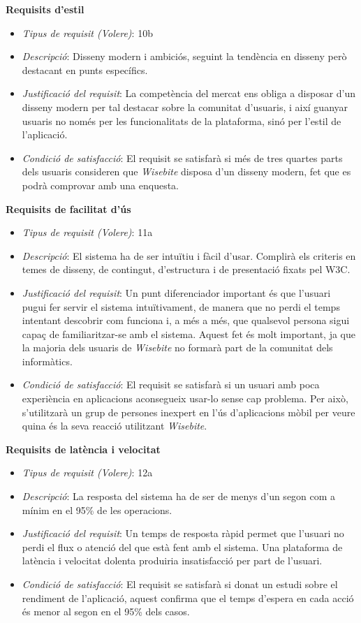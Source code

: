 \noindent\textbf{Requisits d'estil}
\begin{itemize}
\item \textit{Tipus de requisit (Volere)}: 10b
\item \textit{Descripció}: Disseny modern i ambiciós, seguint la tendència en disseny però destacant en punts específics.
\item \textit{Justificació del requisit}: La competència del mercat ens obliga a disposar d'un disseny modern per tal destacar sobre la comunitat d'usuaris, i així guanyar usuaris no només per les funcionalitats de la plataforma, sinó per l'estil de l'aplicació.
\item \textit{Condició de satisfacció}: El requisit se satisfarà si més de tres quartes parts dels usuaris consideren que \textit{Wisebite} disposa d'un disseny modern, fet que es podrà comprovar amb una enquesta.
\end{itemize}

\noindent\textbf{Requisits de facilitat d'ús}
\begin{itemize}
\item \textit{Tipus de requisit (Volere)}: 11a
\item \textit{Descripció}: El sistema ha de ser intuïtiu i fàcil d'usar. Complirà els criteris en temes de disseny, de contingut, d'estructura i de presentació fixats pel W3C\cite{w3c}.
\item \textit{Justificació del requisit}: Un punt diferenciador important és que l'usuari pugui fer servir el sistema intuïtivament, de manera que no perdi el temps intentant descobrir com funciona i, a més a més, que qualsevol persona sigui capaç de familiaritzar-se amb el sistema. Aquest fet és molt important, ja que la majoria dels usuaris de \textit{Wisebite} no formarà part de la comunitat dels informàtics.
\item \textit{Condició de satisfacció}: El requisit se satisfarà si un usuari amb poca experiència en aplicacions aconsegueix usar-lo sense cap problema. Per això, s'utilitzarà un grup de persones inexpert en l'ús d'aplicacions mòbil per veure quina és la seva reacció utilitzant \textit{Wisebite}.
\end{itemize}

\noindent\textbf{Requisits de latència i velocitat}
\begin{itemize}
\item \textit{Tipus de requisit (Volere)}: 12a
\item \textit{Descripció}: La resposta del sistema ha de ser de menys d'un segon com a mínim en el 95\% de les operacions.
\item \textit{Justificació del requisit}: Un temps de resposta ràpid permet que l'usuari no perdi el flux o atenció del que està fent amb el sistema. Una plataforma de latència i velocitat dolenta produiria insatisfacció per part de l'usuari.
\item \textit{Condició de satisfacció}: El requisit se satisfarà si donat un estudi sobre el rendiment de l'aplicació, aquest confirma que el temps d'espera en cada acció és menor al segon en el 95\% dels casos.
\end{itemize}

